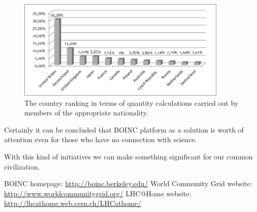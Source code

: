 \documentclass[10pt, a5paper]{article}
\begin{document}
\begin{figure}[h]
  \centering
  \includegraphics[width=10cm]{104_2013_w_Swierczewski_boinc_3}
  \caption{The country ranking in terms of quantity calculations carried out by members of the appropriate nationality.}\label{fig:swier3}
\end{figure}

Certainly it can be concluded that BOINC platform as a solution is worth of attention even for those who have no connection with science.

With this kind of initiatives we can make something significant for our common civilization.

\begin{thebibliography}{9}
 BOINC homepage: \url{http://boinc.berkeley.edu/}
 World Community Grid website: \url{http://www.worldcommunitygrid.org/}
 LHC@Home website: \url{http://lhcathome.web.cern.ch/LHCathome/}
\end{thebibliography}
\end{document}
